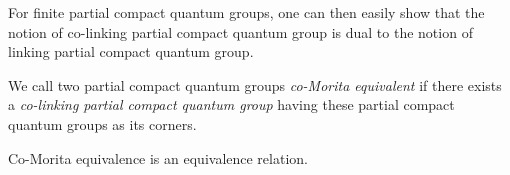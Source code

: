 \begin{Rem} For finite partial compact quantum groups, one can then easily show that the notion of co-linking partial compact quantum group is dual to the notion of linking partial compact quantum group.\end{Rem}

\begin{Def} We call two partial compact quantum groups \emph{co-Morita equivalent} if there exists a \emph{co-linking partial compact quantum group} having these partial compact quantum groups as its corners.
\end{Def}

\begin{Lem} Co-Morita equivalence is an equivalence relation. 
\end{Lem} 

